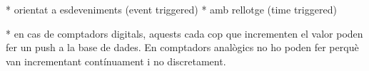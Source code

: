 \todo{}
* orientat a esdeveniments (event triggered)
* amb rellotge (time triggered)

* en cas de comptadors digitals, aquests cada cop que incrementen el valor poden fer un push a la base de dades. En comptadors analògics no ho poden fer perquè van incrementant contínuament i no discretament.












